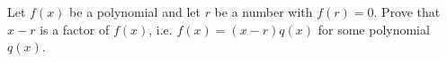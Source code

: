 Let $f(x)$ be a polynomial and let $r$ be a number with $f(r)=0$. Prove that $x-r$ is a factor of $f(x)$, i.e. $f(x)=(x-r)q(x)$ for some polynomial $q(x)$.
